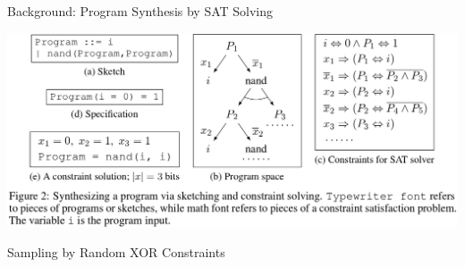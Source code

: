 \documentclass[final]{beamer}
\newlength{\onecolwid}
\newlength{\twocolwid}
\begin{document}
\begin{frame}[t]
\begin{columns}[t]
\begin{column}{\twocolwid}
\begin{columns}[t,totalwidth=\twocolwid] %

\begin{column}{\onecolwid}\vspace{-.6in} %

%

  
  \begin{block}{Background: Program Synthesis by SAT Solving}

\hspace{-2.5cm}\includegraphics[width=45cm]{background.png}
  \end{block}

  \begin{block}{Sampling by Random XOR Constraints}


\end{block}
\end{column}
\end{columns}
\end{column}
\end{columns}
\end{frame}
\end{document}
